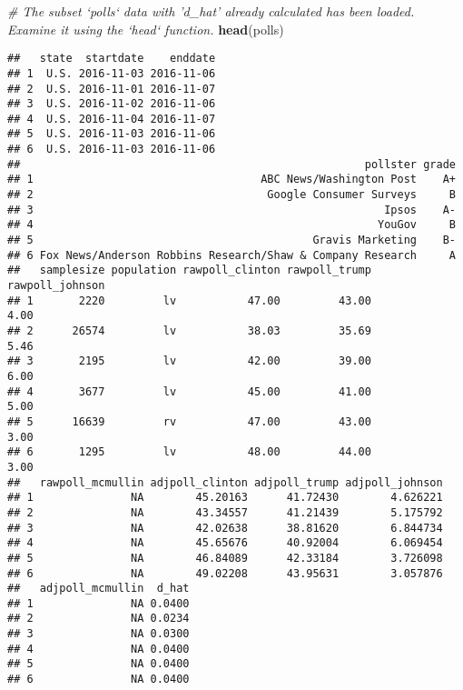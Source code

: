 \documentclass[]{article}
\newenvironment{Shaded}{\begin{snugshade}}{\end{snugshade}}
\newcommand{\KeywordTok}[1]{\textcolor[rgb]{0.13,0.29,0.53}{\textbf{#1}}}
\newcommand{\CommentTok}[1]{\textcolor[rgb]{0.56,0.35,0.01}{\textit{#1}}}
\newcommand{\NormalTok}[1]{#1}
\begin{document}
\begin{Shaded}
\begin{Highlighting}[]
\CommentTok{# The subset `polls` data with 'd_hat' already calculated has been loaded. Examine it using the `head` function.}
\KeywordTok{head}\NormalTok{(polls)}
\end{Highlighting}
\end{Shaded}

\begin{verbatim}
##   state  startdate    enddate
## 1  U.S. 2016-11-03 2016-11-06
## 2  U.S. 2016-11-01 2016-11-07
## 3  U.S. 2016-11-02 2016-11-06
## 4  U.S. 2016-11-04 2016-11-07
## 5  U.S. 2016-11-03 2016-11-06
## 6  U.S. 2016-11-03 2016-11-06
##                                                     pollster grade
## 1                                   ABC News/Washington Post    A+
## 2                                    Google Consumer Surveys     B
## 3                                                      Ipsos    A-
## 4                                                     YouGov     B
## 5                                           Gravis Marketing    B-
## 6 Fox News/Anderson Robbins Research/Shaw & Company Research     A
##   samplesize population rawpoll_clinton rawpoll_trump rawpoll_johnson
## 1       2220         lv           47.00         43.00            4.00
## 2      26574         lv           38.03         35.69            5.46
## 3       2195         lv           42.00         39.00            6.00
## 4       3677         lv           45.00         41.00            5.00
## 5      16639         rv           47.00         43.00            3.00
## 6       1295         lv           48.00         44.00            3.00
##   rawpoll_mcmullin adjpoll_clinton adjpoll_trump adjpoll_johnson
## 1               NA        45.20163      41.72430        4.626221
## 2               NA        43.34557      41.21439        5.175792
## 3               NA        42.02638      38.81620        6.844734
## 4               NA        45.65676      40.92004        6.069454
## 5               NA        46.84089      42.33184        3.726098
## 6               NA        49.02208      43.95631        3.057876
##   adjpoll_mcmullin  d_hat
## 1               NA 0.0400
## 2               NA 0.0234
## 3               NA 0.0300
## 4               NA 0.0400
## 5               NA 0.0400
## 6               NA 0.0400
\end{verbatim}
\end{document}
